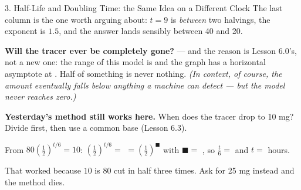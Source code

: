 \documentclass[10pt]{article}
\begin{document}
\begin{notesbox}{3. Half-Life and Doubling Time: the Same Idea on a Different Clock}
\vspace{2pt}
The last column is the one worth arguing about: $t=9$ is \emph{between} two halvings, the exponent is
$1.5$, and the answer lands sensibly between 40 and 20.

\vspace{3pt}
\textbf{Will the tracer ever be completely gone?}  --- and the reason is Lesson 6.0's, not
a new one: the range of this model is \ans{$(0,80]$} and the graph has a horizontal asymptote at
. Half of something is never nothing. \emph{(In context, of course, the amount eventually
falls below anything a machine can detect --- but the model never reaches zero.)}

\vspace{4pt}
\begin{tcolorbox}[colback=greenbg, colframe=greenacc, boxrule=0.8pt, arc=1.5mm,
    left=2.5mm, right=2.5mm, top=1.5mm, bottom=1.5mm]
\textbf{Yesterday's method still works here.} When does the tracer drop to 10 mg? Divide first, then
use a common base (Lesson 6.3).

\vspace{3pt}
\hspace*{1.0em} From $80\left(\frac12\right)^{t/6}=10$: \quad
$\left(\frac12\right)^{t/6}=$  $=\left(\frac12\right)^{\blacksquare}$ with
$\blacksquare=$ , \quad so $\frac{t}{6}=$  \; and \; $t=$  hours.

\vspace{3pt}
That worked because $10$ is $80$ cut in half three times. Ask for 25 mg instead and the method dies.
\end{tcolorbox}
\end{notesbox}
\end{document}
